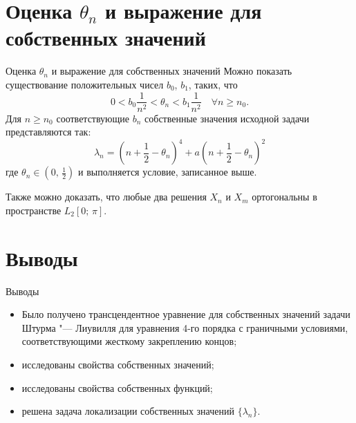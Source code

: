 \documentclass[10pt, ignoreonframetext,unicode]{beamer}
\begin{document}
\section{Оценка $\theta_n$ и выражение для собственных значений}
\begin{frame}{Оценка $\theta_n$ и выражение для собственных значений}
	Можно показать существование положительных чисел $b_0$, $b_1$, таких, что
	\begin{equation*}
	0<b_0\frac{1}{n^2}<\theta_n<b_1\frac{1}{n^2} \quad \forall n\ge n_0. \label{unequal2}
	\end{equation*}
	Для $n\ge n_0$ соответствующие $b_n$ собственные значения исходной задачи представляются так:
	\[
	\lambda_n = (n+\frac12 - \theta_n)^4 + a(n+\frac12 - \theta_n)^2
	\]
	где $\theta_n\in (0,\,\frac12)$ и выполняется условие, записанное выше.
	
	Также можно доказать, что любые два решения $X_n$ и $X_m$ ортогональны в про\-стран\-стве $L_2 [0;\,\pi]$.
\end{frame}

\section{Выводы}
\begin{frame}{Выводы}
	\begin{itemize}
	\item Было получено трансцендентное уравнение для собственных значений задачи Штурма "--- Лиувилля для уравнения 4-го порядка с граничными условиями, соответствующими жесткому закреплению концов;\\
	\item исследованы свойства собственных значений;\\
	\item исследованы свойства собственных функций; \\
	\item решена задача локализации собственных значений $\{\lambda_n\}$.
	\end{itemize}
\end{frame}
\end{document}
